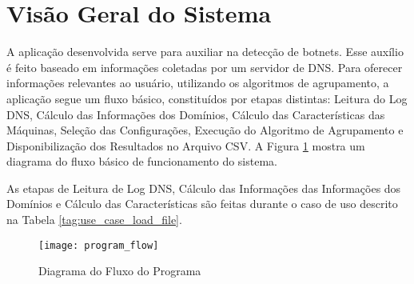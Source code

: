 \section{Visão Geral do Sistema}
A aplicação desenvolvida serve para auxiliar na detecção de botnets. Esse auxílio é feito baseado em informações coletadas por um servidor de DNS. Para oferecer informações relevantes ao usuário, utilizando os algoritmos de agrupamento, a aplicação segue um fluxo básico, constituídos por etapas distintas: Leitura do Log DNS, Cálculo das Informações dos Domínios, Cálculo das Características das Máquinas, Seleção das Configurações, Execução do Algoritmo de Agrupamento e Disponibilização dos Resultados no Arquivo CSV. A Figura \ref{fig:program_flow} mostra um diagrama do fluxo básico de funcionamento do sistema.

As etapas de Leitura de Log DNS, Cálculo das Informações das Informações dos Domínios e Cálculo das Características são feitas durante o caso de uso descrito na Tabela \ref{tag:use_case_load_file}.

\begin{figure}
\centering
\texttt{[image: program\_flow]}
\caption[Diagram do Fluxo do Programa]{Diagrama do Fluxo do Programa} \label{fig:program_flow}
\end{figure}
